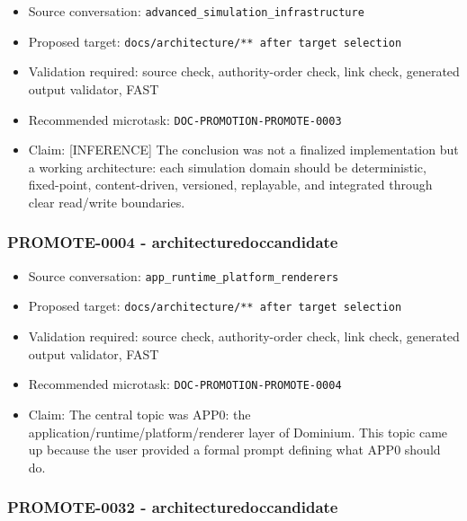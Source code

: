 \documentclass[9pt,a4paper,openany]{book}
\begin{document}
\begin{itemize}
\item Source conversation: \texttt{advanced\_\allowbreak{}simulation\_\allowbreak{}infrastructure}
\item Proposed target: \texttt{docs/\allowbreak{}architecture/\allowbreak{}** after target selection}
\item Validation required: source check, authority-\allowbreak{}order check, link check, generated output validator, FAST
\item Recommended microtask: \texttt{DOC-\allowbreak{}PROMOTION-\allowbreak{}PROMOTE-\allowbreak{}0003}
\item Claim: [INFERENCE] The conclusion was not a finalized implementation but a working architecture: each simulation domain should be deterministic, fixed-\allowbreak{}point, content-\allowbreak{}driven, versioned, replayable, and integrated through clear read/\allowbreak{}write boundaries.\allowbreak{}
\end{itemize}

\subsubsection{PROMOTE-0004 - architecturedoccandidate}

\begin{itemize}
\item Source conversation: \texttt{app\_\allowbreak{}runtime\_\allowbreak{}platform\_\allowbreak{}renderers}
\item Proposed target: \texttt{docs/\allowbreak{}architecture/\allowbreak{}** after target selection}
\item Validation required: source check, authority-\allowbreak{}order check, link check, generated output validator, FAST
\item Recommended microtask: \texttt{DOC-\allowbreak{}PROMOTION-\allowbreak{}PROMOTE-\allowbreak{}0004}
\item Claim: The central topic was APP0: the application/\allowbreak{}runtime/\allowbreak{}platform/\allowbreak{}renderer layer of Dominium.\allowbreak{} This topic came up because the user provided a formal prompt defining what APP0 should do.\allowbreak{}
\end{itemize}

\subsubsection{PROMOTE-0032 - architecturedoccandidate}
\end{document}
